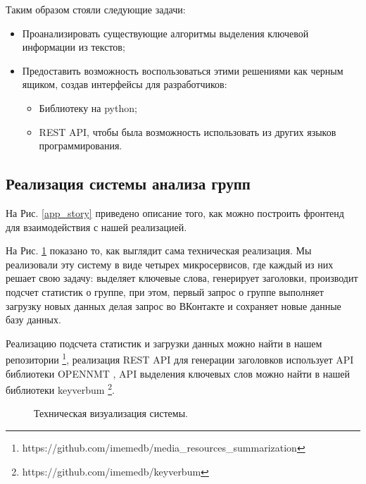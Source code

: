 \documentclass[14pt]{matmex-diploma-custom}
\begin{document}
Таким образом стояли следующие задачи:

\begin{itemize}
  \item Проанализировать существующие алгоритмы выделения ключевой информации из текстов;
  \item Предоставить возможность воспользоваться этими решениями как черным ящиком, создав интерфейсы для разработчиков:
  \begin{itemize}
    \item Библиотеку на python;
    \item REST API, чтобы была возможность использовать из других языков программирования.
  \end{itemize}
\end{itemize}

\subsection{Реализация системы анализа групп}

На Рис. \ref{app_story} приведено описание того, как можно построить фронтенд для взаимодействия с нашей реализацией.

На Рис. \ref{img:techincal_story} показано то, как выглядит сама техническая реализация. Мы реализовали эту систему в виде четырех микросервисов, где каждый из них решает свою задачу: выделяет ключевые слова, генерирует заголовки, производит подсчет статистик о группе, при этом, первый запрос о группе выполняет загрузку новых данных делая запрос во ВКонтакте и сохраняет новые данные базу данных.

Реализацию подсчета статистик и загрузки данных можно найти в нашем репозитории \footnote{https://github.com/imemedb/media\_resources\_summarization}, реализация REST API для генерации заголовков использует API библиотеки OPENNMT \cite{2017opennmt}, API выделения ключевых слов можно найти в нашей библиотеки keyverbum \footnote{https://github.com/imemedb/keyverbum}.

\begin{figure}[ht]
\begin{center}


\caption{
\label{img:techincal_story} Техническая визуализация системы.
        }
\end {center}
\end {figure}
\end{document}
